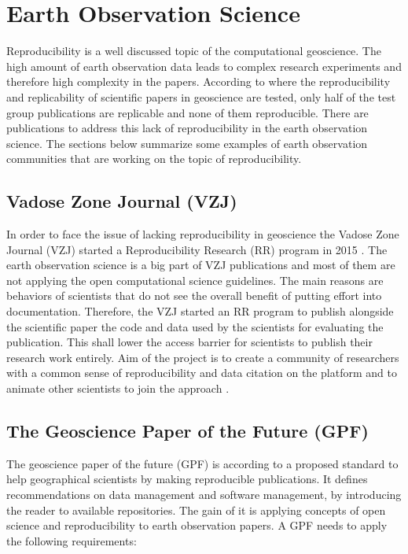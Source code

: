 \documentclass[draft,final]{vutinfth} %
\begin{document}
\section{Earth Observation Science}\label{EOScience}

Reproducibility is a well discussed topic of the computational geoscience. The high amount of earth observation data leads to complex research experiments and therefore high complexity in the papers.  According to \cite{Ostermann2017AdvancingSW} where the reproducibility and replicability of scientific papers in geoscience are tested, only half of the test group publications are replicable and none of them reproducible. There are publications to address this lack of reproducibility in the earth observation science. The sections below summarize some examples of earth observation communities that are working on the topic of reproducibility. 

\subsection{Vadose Zone Journal (VZJ)}\label{VZJ}
In order to face the issue of lacking reproducibility in geoscience the Vadose Zone Journal (VZJ) started a Reproducibility Research (RR) program in 2015 \cite{doi:10.2136/vzj2015.06.0088}. 
The earth observation science is a big part of VZJ publications and most of them are not applying the open computational science guidelines. The main reasons are behaviors of scientists that do not see the overall benefit of putting effort into documentation. Therefore, the VZJ started an RR program to publish alongside the scientific paper the code and data used by the scientists for evaluating the publication. This shall lower the access barrier for scientists to publish their research work entirely. Aim of the project is to create a community of researchers with a common sense of reproducibility and data citation on the platform and to animate other scientists to join the approach \cite{doi:10.2136/vzj2015.06.0088}.

\subsection{The Geoscience Paper of the Future (GPF)}\label{GPF}
The geoscience paper of the future (GPF) is according to \cite{Gil2016TowardTG} a proposed standard to help geographical scientists by making reproducible publications. It defines recommendations on data management and software management, by introducing the reader to available repositories. The gain of it is applying concepts of open science and reproducibility to earth observation papers. A GPF needs to apply the following requirements:
\end{document}

